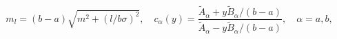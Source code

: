 \begin{equation}\label{ml}
  m_l=(b-a)\sqrt{m^2+(l/b\sigma )^2},\quad c_{\alpha }(y)=
  \frac{\tilde A_{\alpha}+y\tilde B_{\alpha}/(b-a)}{\tilde A_{\alpha}
  -y\tilde B_{\alpha}/(b-a)},\quad \alpha =a,b,
\end{equation}

